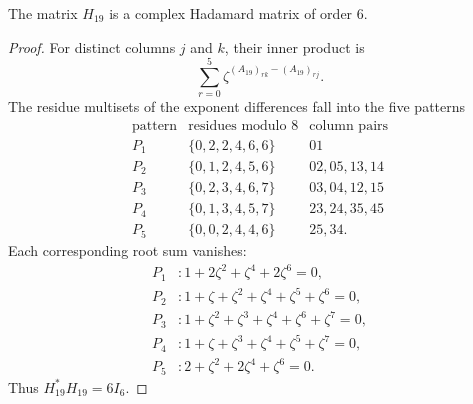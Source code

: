\documentclass[10pt,a4paper]{amsart}
\begin{document}
\begin{proposition}\label{prop:H19had}
The matrix $H_{19}$ is a complex Hadamard matrix of order $6$.
\end{proposition}

\begin{proof}
For distinct columns $j$ and $k$, their inner product is
\[
  \sum_{r=0}^5 \zeta^{(A_{19})_{rk}-(A_{19})_{rj}}.
\]
The residue multisets of the exponent differences fall into the five patterns
\[
\begin{array}{c|c|c}
\text{pattern}&\text{residues modulo }8&\text{column pairs}\\
\hline
P_1&\{0,2,2,4,6,6\}&01\\
P_2&\{0,1,2,4,5,6\}&02,05,13,14\\
P_3&\{0,2,3,4,6,7\}&03,04,12,15\\
P_4&\{0,1,3,4,5,7\}&23,24,35,45\\
P_5&\{0,0,2,4,4,6\}&25,34.
\end{array}
\]
Each corresponding root sum vanishes:
\[
\begin{aligned}
P_1&: 1+2\zeta^2+\zeta^4+2\zeta^6=0,\\
P_2&: 1+\zeta+\zeta^2+\zeta^4+\zeta^5+\zeta^6=0,\\
P_3&: 1+\zeta^2+\zeta^3+\zeta^4+\zeta^6+\zeta^7=0,\\
P_4&: 1+\zeta+\zeta^3+\zeta^4+\zeta^5+\zeta^7=0,\\
P_5&: 2+\zeta^2+2\zeta^4+\zeta^6=0.
\end{aligned}
\]
Thus $H_{19}^*H_{19}=6I_6$.
\end{proof}
\end{document}
